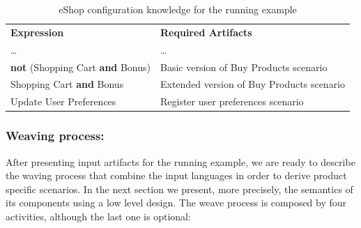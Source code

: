 \begin{table}[h]
\begin{center}
\caption{eShop configuration knowledge for the running example} \label{tab:eshop-running-example}
\begin{tabular}{ll}
   \hline\noalign{\smallskip}
  {\bf Expression} & {\bf Required Artifacts} \\
   \noalign{\smallskip}
   \hline
   \noalign{\smallskip}
    \ldots & \ldots \\
    {\bf not} (Shopping Cart {\bf and} Bonus)\hspace{2pt} & Basic version of Buy Products scenario \\
    Shopping Cart {\bf and} Bonus & Extended version of Buy Products scenario \\
    Update User Preferences & Register user preferences scenario	 \\       
  \hline
\end{tabular}
\end{center}
\end{table}

\subsubsection {Weaving process:} After presenting input artifacts for the running example, we are ready to describe the waving process that combine 
the input languages in order to derive product specific scenarios. In the next section we present, more precisely, the semantics of its components using a low level design. The weave process is composed by four activities, although the last one is optional: 

